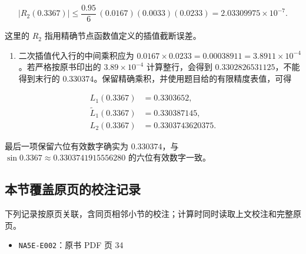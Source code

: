 \documentclass[
  10pt,
  fontset=fandol]{ctexart}
\providecommand{\tightlist}{%
  \setlength{\itemsep}{0pt}\setlength{\parskip}{0pt}}
\begin{document}
\[
|R_2(0.3367)|
\le\frac{0.95}{6}\,(0.0167)(0.0033)(0.0233)
=2.03309975\times10^{-7}.
\]

这里的 \(R_2\) 指用精确节点函数值定义的插值截断误差。

\begin{enumerate}
\def\labelenumi{\arabic{enumi}.}
\setcounter{enumi}{3}
\tightlist
\item
  二次插值代入行的中间乘积应为 \(0.0167\times0.0233=0.00038911=3.8911\times10^{-4}\)。若严格按原书印出的 \(3.89\times10^{-4}\) 计算整行，会得到 \(0.3302826531125\)，不能得到末行的 \(0.330374\)。保留精确乘积，并使用题目给的有限精度表值，可得
\end{enumerate}

\[
\begin{aligned}
L_1(0.3367)&=0.3303652,\\
\widetilde L_1(0.3367)&=0.330387145,\\
L_2(0.3367)&=0.3303743620375.
\end{aligned}
\]

最后一项保留六位有效数字确实为 \(0.330374\)，与 \(\sin0.3367\approx0.3303741915556280\) 的六位有效数字一致。

\subsection{本节覆盖原页的校注记录}\label{ux672cux8282ux8986ux76d6ux539fux9875ux7684ux6821ux6ce8ux8bb0ux5f55}

下列记录按原页关联，含同页相邻小节的校注；计算时同时读取上文校注和完整原页。

\begin{itemize}
\tightlist
\item
  \texttt{NA5E-E002}：原书 PDF 页 34
\end{itemize}
\end{document}
